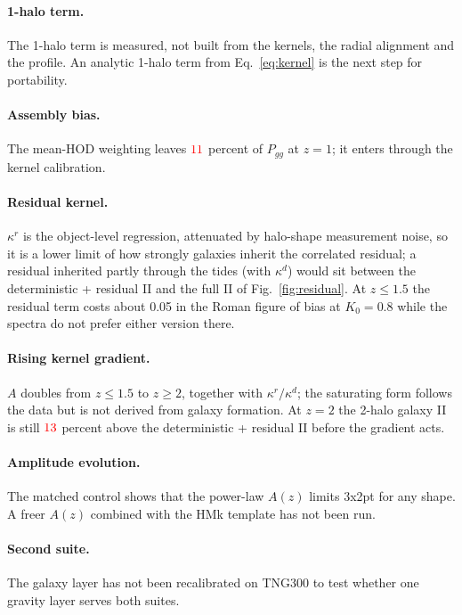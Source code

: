\documentclass[11pt]{article}
\newif\ifnumbersfinal
\newcommand{\refresh}[1]{\ifnumbersfinal#1\else\textcolor{red}{#1}\fi}
\begin{document}
\paragraph{1-halo term.} The 1-halo term is measured, not built from the
kernels, the radial alignment and the profile. An analytic 1-halo term
from Eq.~\eqref{eq:kernel} is the next step for portability.

\paragraph{Assembly bias.} The mean-HOD weighting leaves
$\refresh{\ggMeanMiss}$ percent of $P_{gg}$ at $z=1$; it enters through the
kernel calibration.

\paragraph{Residual kernel.} $\kappa^r$ is the object-level regression,
attenuated by halo-shape measurement noise, so it is a lower limit of how
strongly galaxies inherit the correlated residual; a residual inherited
partly through the tides (with $\kappa^d$) would sit between the
deterministic + residual II and the full II of Fig.~\ref{fig:residual}.
At $z\le1.5$ the residual term costs about 0.05 in the Roman figure of
bias at $K_0=0.8$ while the spectra do not prefer either version there.

\paragraph{Rising kernel gradient.} $A$ doubles from $z\le1.5$ to $z\ge2$,
together with $\kappa^r/\kappa^d$; the saturating form follows the data
but is not derived from galaxy formation. At $z=2$ the 2-halo galaxy II is
still $\refresh{\iiResExcessTwo}$ percent above the deterministic +
residual II before the gradient acts.

\paragraph{Amplitude evolution.} The matched control shows that the
power-law $A(z)$ limits 3x2pt for any shape. A freer $A(z)$ combined with
the HMk template has not been run.

\paragraph{Second suite.} The galaxy layer has not been recalibrated on
TNG300 to test whether one gravity layer serves both suites.
\end{document}
